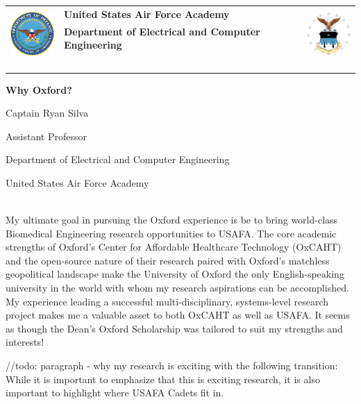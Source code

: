 \documentclass{article}
\begin{document}
	\noindent \begin{tabu} to \textwidth{l X[c] r}
	 & 
	\textbf{United States Air Force Academy} &  
	\\
	& \textbf{ Department of Electrical and Computer Engineering} & \\ \\
	\\ \\ \\ \\
	\end{tabu}

	\centerline{\LARGE{\textbf{Why Oxford?}}}
	\centerline{\Large{Captain Ryan Silva}}
	\centerline{\large{Assistant Professor}}
	\centerline{\large{Department of Electrical and Computer Engineering}}
	\centerline{\large{United States Air Force Academy}} \hspace{0pt} \\
\indent My ultimate goal in pursuing the Oxford experience is be to bring world-class
Biomedical Engineering research opportunities to USAFA. The core academic
strengths of Oxford’s Center for Affordable Healthcare Technology (OxCAHT) and
the open-source nature of their research paired with Oxford’s matchless
geopolitical landscape make the University of Oxford the only English-speaking
university in the world with whom my research aspirations can be accomplished.
My experience leading a successful multi-disciplinary, systems-level research
project makes me a valuable asset to both OxCAHT as well as USAFA. It seems as
though the Dean’s Oxford Scholarship was tailored to suit my strengths and
interests!
 
//todo: paragraph  - why my research is exciting with the following transition:
While it is important to emphasize that this is exciting research, it is also
important to highlight where USAFA Cadets fit in.
 
\end{document}
